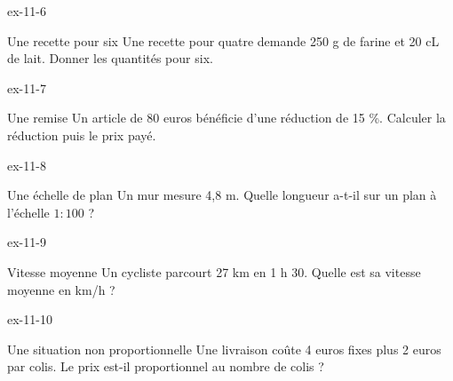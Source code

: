 \begin{blocLivre}{ex-11-6}\begin{exercice}[2]{Une recette pour six}
Une recette pour quatre demande 250 g de farine et 20 cL de lait. Donner les quantités pour six.
\end{exercice}\end{blocLivre}
\begin{blocLivre}{ex-11-7}\begin{exercice}[2]{Une remise}
Un article de 80 euros bénéficie d’une réduction de 15 \%. Calculer la réduction puis le prix payé.
\end{exercice}\end{blocLivre}
\begin{blocLivre}{ex-11-8}\begin{exercice}[2]{Une échelle de plan}
Un mur mesure 4,8 m. Quelle longueur a-t-il sur un plan à l’échelle $1:100$ ?
\label{fig-ex-11-8}
\end{exercice}\end{blocLivre}
\begin{blocLivre}{ex-11-9}\begin{exercice}[2]{Vitesse moyenne}
Un cycliste parcourt 27 km en 1 h 30. Quelle est sa vitesse moyenne en km/h ?
\end{exercice}\end{blocLivre}
\begin{blocLivre}{ex-11-10}\begin{exercice}[2]{Une situation non proportionnelle}
Une livraison coûte 4 euros fixes plus 2 euros par colis. Le prix est-il proportionnel au nombre de colis ?
\end{exercice}\end{blocLivre}

